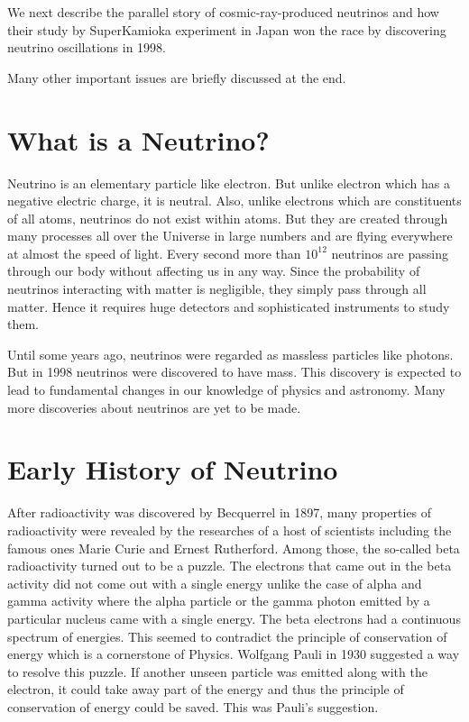 We next describe the parallel story of cosmic-ray-produced neutrinos and
how their study by SuperKamioka experiment in Japan won the race by
discovering neutrino oscillations in 1998.

Many other important issues are briefly discussed at the end.

\section{What is a Neutrino?}

Neutrino is an elementary particle like electron. But unlike electron which
has a negative electric charge, it is neutral. Also, unlike electrons which are
constituents of all atoms, neutrinos do not exist within atoms. But they
are created through many processes all over the Universe in large numbers
and are flying everywhere at almost the speed of light. Every second more
than $10^{12}$ neutrinos are passing through our body without affecting us in any
way. Since the probability of neutrinos interacting with matter is negligible,
they simply pass through all matter. Hence it requires huge detectors and
sophisticated instruments to study them.

Until some years ago, neutrinos were regarded as massless particles like photons. But in 1998 neutrinos were discovered to have mass. This discovery
is expected to lead to fundamental changes in our knowledge of physics and
astronomy. Many more discoveries about neutrinos are yet to be made.

\section{Early History of Neutrino}

After radioactivity was discovered by Becquerrel in 1897, many properties
of radioactivity were revealed by the researches of a host of scientists including the famous ones Marie Curie and Ernest Rutherford. Among those, the
so-called beta radioactivity turned out to be a puzzle. The electrons that
came out in the beta activity did not come out with a single energy unlike
the case of alpha and gamma activity where the alpha particle or the gamma
photon emitted by a particular nucleus came with a single energy. The beta
electrons had a continuous spectrum of energies. This seemed to contradict
the principle of conservation of energy which is a cornerstone of Physics.
Wolfgang Pauli in 1930 suggested a way to resolve this puzzle. If another
unseen particle was emitted along with the electron, it could take away part
of the energy and thus the principle of conservation of energy could be saved.
This was Pauli’s suggestion.

